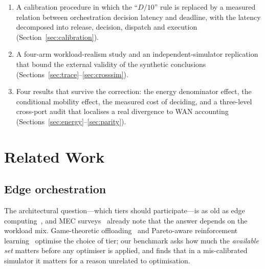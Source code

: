 \documentclass[journal,10pt]{IEEEtran}
\begin{document}
\begin{enumerate}
  separates the artefact from the phenomenon: the architecture effect changes
  sign with the clock and is predicted by the capacity gap between tiers
  (Section~\ref{sec:hetero}).
\item A calibration procedure in which the ``$D/10$'' rule is replaced by a
  measured relation between orchestration decision latency and deadline, with
  the latency decomposed into release, decision, dispatch and execution
  (Section~\ref{sec:calibration}).
\item A four-arm workload-realism study and an independent-simulator
  replication that bound the external validity of the synthetic conclusions
  (Sections~\ref{sec:trace}--\ref{sec:crosssim}).
\item Four results that survive the correction: the energy denominator effect,
  the conditional mobility effect, the measured cost of deciding, and a
  three-level cross-port audit that localises a real divergence to WAN
  accounting (Sections~\ref{sec:energy}--\ref{sec:parity}).
\end{enumerate}

\section{Related Work}
\label{sec:related}

\subsection{Edge orchestration}
The architectural question---which tiers should participate---is as old as edge
computing~\cite{satyanarayanan2017,shi2016edge}, and MEC
surveys~\cite{mao2017survey,mach2017survey} already note that the answer depends
on the workload mix. Game-theoretic offloading~\cite{chen2015game} and
Pareto-aware reinforcement learning~\cite{xu2026paretoRL} optimise the choice of
tier; our benchmark asks how much the \emph{available set} matters before any
optimiser is applied, and finds that in a mis-calibrated simulator it matters
for a reason unrelated to optimisation.
\end{document}
